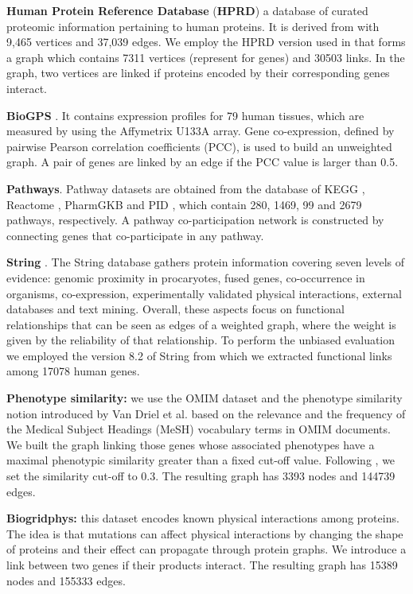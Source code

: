 \textbf{Human Protein Reference Database} (\textbf{HPRD}) a database of curated proteomic information pertaining to human proteins. It is derived from \cite{keshava2008human} with 9,465 vertices and 37,039 edges. We employ the HPRD version used in \cite{chatr2014biogrid} that forms a graph which contains 7311 vertices (represent for genes) and 30503 links. In the graph, two vertices are linked if proteins encoded by their corresponding genes interact.

\textbf{BioGPS} \cite{wu2009biogps}. It contains expression profiles for 79 human tissues, which are measured by using the Affymetrix U133A array. Gene co-expression, defined by pairwise Pearson correlation coefficients (PCC), is used to build an unweighted graph. A pair of genes are linked by an edge if the PCC value is larger than 0.5.

\textbf{Pathways}. Pathway datasets are obtained from the database of KEGG \cite{ogata1999kegg}, Reactome \cite{vastrik2007reactome}, PharmGKB \cite{whirl2012pharmacogenomics} and PID \cite{schaefer2008pid}, which contain 280, 1469, 99 and 2679 pathways, respectively. A pathway co-participation network is constructed by connecting genes that co-participate in any pathway.

\textbf{String} \cite{jensen2008string}. The String database gathers protein information covering seven levels of evidence: genomic proximity in procaryotes, fused genes, co-occurrence in organisms, co-expression, experimentally validated physical interactions, external databases and text mining. Overall, these aspects focus on functional relationships that can be seen as edges of a weighted graph, where the weight is given by the reliability of that relationship. To perform the unbiased evaluation we employed the version 8.2 of String from which we extracted functional links among 17078 human genes.

\textbf{Phenotype similarity:} we use the OMIM \cite{mckusick2007mendelian} dataset and the phenotype similarity notion introduced by Van Driel et al. \cite{van2006text} based on the relevance and the frequency of the Medical Subject Headings (MeSH) vocabulary terms in OMIM documents. We built the graph linking those genes whose associated phenotypes have a maximal phenotypic similarity greater than a fixed cut-off value. Following \cite{van2006text}, we set the similarity cut-off to $0.3$. The resulting graph has 3393 nodes and 144739 edges.

\textbf{Biogridphys:} this dataset encodes known physical interactions among proteins. The idea is that mutations can affect physical interactions by changing the shape of proteins and their effect can propagate through protein graphs. We introduce a link between two genes if their products interact. The resulting graph has 15389 nodes and 155333 edges.

